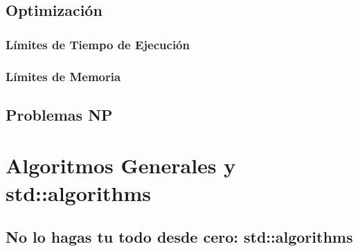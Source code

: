 \documentclass[12pt, fleqn]{report}                             %
\theoremstyle{break}                                            %
\begin{document}
    \chapter{Optimización}

        \section{Límites de Tiempo de Ejecución}

        \section{Límites de Memoria}



    \clearpage
    \chapter{Problemas NP}


\part{Algoritmos Generales y std::algorithms}

    \clearpage
    \chapter{No lo hagas tu todo desde cero: std::algorithms}
\end{document}

